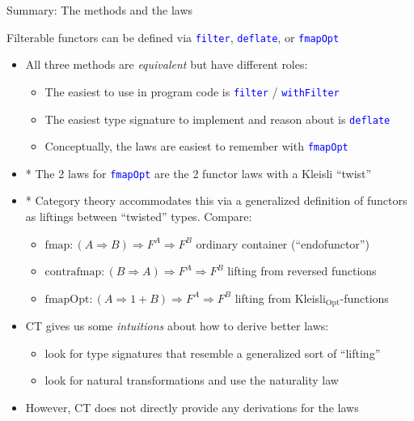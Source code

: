 \documentclass[english]{beamer}
\begin{document}
\begin{frame}{Summary: The methods and the laws}

Filterable functors can be defined via \texttt{\textcolor{blue}{\footnotesize{}filter}},
\texttt{\textcolor{blue}{\footnotesize{}deflate}}, or \texttt{\textcolor{blue}{\footnotesize{}fmapOpt}} 
\begin{itemize}
\item All three methods are \emph{equivalent} but have different roles:
\begin{itemize}
\item The easiest to use in program code is \texttt{\textcolor{blue}{\footnotesize{}filter}}
/ \texttt{\textcolor{blue}{\footnotesize{}withFilter}} 
\item The easiest type signature to implement and reason about is \texttt{\textcolor{blue}{\footnotesize{}deflate}} 
\item Conceptually, the laws are easiest to remember with \texttt{\textcolor{blue}{\footnotesize{}fmapOpt}} 
\end{itemize}
\item {*} The 2 laws for \texttt{\textcolor{blue}{\footnotesize{}fmapOpt}}
are the 2 functor laws with a Kleisli ``twist''
\item {*} Category theory accommodates this via a generalized definition
of functors as liftings between ``twisted'' types. Compare:
\begin{itemize}
\item $\text{fmap}:\left(A\Rightarrow B\right)\Rightarrow F^{A}\Rightarrow F^{B}$
\textendash{} ordinary container (``endofunctor'')
\item $\text{contrafmap}:\left(B\Rightarrow A\right)\Rightarrow F^{A}\Rightarrow F^{B}$
\textendash{} lifting from reversed functions
\item $\text{fmapOpt}:\left(A\Rightarrow1+B\right)\Rightarrow F^{A}\Rightarrow F^{B}$
\textendash{} lifting from Kleisli$_{\text{Opt}}$-functions 
\end{itemize}
\item CT gives us some \emph{intuitions} about how to derive better laws:
\begin{itemize}
\item look for type signatures that resemble a generalized sort of ``lifting''
\item look for natural transformations and use the naturality law
\end{itemize}
\item However, CT does not directly provide any derivations for the laws

\end{itemize}
\end{frame}
\end{document}
